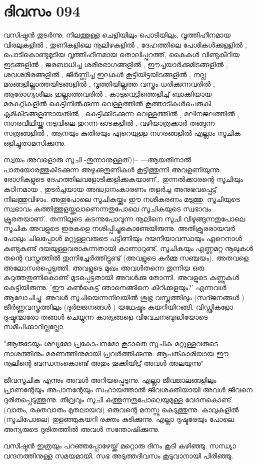 \newpage
\section{ദിവസം 094}


വസിഷ്ഠന്‍ തുടര്‍ന്നു: നിലത്തുള്ള ചെളിയിലും പൊടിയിലും, വൃത്തിഹീനമായ വിരലുകളില്‍ , തുണികളിലെ നൂലിഴകളില്‍ , ദേഹത്തിലെ പേശികള്‍ക്കുള്ളില്‍ , പൊടികൊണ്ടുമൂടിയ വൃത്തിഹീനമായ തൊലിപ്പുറത്ത്‌, കൈകള്‍ വിണ്ടുകീറിയ ഇടങ്ങളില്‍ , ജരബാധിച്ച ശരീരഭാഗങ്ങളില്‍ , ഈച്ചയാര്‍ക്കുമിടങ്ങളില്‍ , ശവശരീരങ്ങളില്‍ , ജീര്‍ണ്ണിച്ച ഇലകള്‍ കൂട്ടിയിട്ടയിടങ്ങളില്‍ , നല്ല മരങ്ങളില്ലാത്തയിടങ്ങളില്‍ , വൃത്തിയില്ലത്ത വസ്ത്രം ധരിക്കുന്നവരില്‍ , ആരോഗ്യശീലം ഇല്ലാത്തവരില്‍ , കാടുവെട്ടിത്തെളിച്ച്‌ ബാക്കിയായ മരകുറ്റികളില്‍ കെട്ടിനില്‍ക്കുന്ന വെള്ളത്തില്‍ കൂത്താടികള്‍പെരുകി കൃമികീടങ്ങളുണ്ടായതില്‍ , കെട്ടിക്കിടക്കുന്ന വെള്ളത്തില്‍ , മലിനജലത്തില്‍ , നഗരവീഥിയ്ക്കു നടുവിലെ തുറന്ന ഓടകളില്‍ , വഴിയാത്രക്കാര്‍ തങ്ങുന്ന സത്രങ്ങളില്‍ , ആനയും കുതിരയും ഏറെയുള്ള നഗരങ്ങളില്‍ എല്ലാം സൂചിക ഒളിച്ചുതാമസിക്കുന്നു. 


സ്വയം അവളൊരു സൂചി -തുന്നാനുള്ളത്‌))-- ---ആയതിനാല്‍ പാതയോരത്തുകിടക്കുന്ന അഴുക്കുതുണികള്‍ കൂട്ടിത്തുന്നി അവളണിയുന്നു. രോഗികളുടെ ദേഹത്തിലവളോടിക്കളിക്കുകയാണ്‌..  തുന്നല്‍ക്കാരന്റെ സൂചിയും കഠിനമായ , തുടര്‍ച്ചയായ അദ്ധ്വാനംകാരണം തളര്‍ച്ച അനുഭവപ്പെട്ട്‌ നിലത്തുവിഴാം.  അതുപോലെ സൂചികയ്ക്കും ഈ നശീകരണം മടുത്തു. സൂചിയുടെ സ്വഭാവം കുത്തിത്തുളയ്ക്കലാണെന്നതുപോലെ സൂചികയുടെ സ്വഭാവം ക്രൂരതയാണ്‌..  തന്നിലൂടെ കടന്നുപോവുന്ന നൂലിനെ സൂചി വിഴുങ്ങുന്നതുപോലെ സൂചിക അവളുടെ ഇരകളെ നശിപ്പിച്ചുകൊണ്ടേയിരുന്നു. അതിക്രൂരരായവര്‍ പോലും ചിലപ്പോള്‍ മറ്റുള്ളവരുടെ പട്ടിണിയും ദയനീയാവസ്ഥയും ഏറെനാള്‍ കണ്ടുകണ്ട്‌ ദയയുള്ളവരാകുന്നതായി കാണാറുണ്ട്‌. സൂചികയും എണ്ണമറ്റ നൂലുകള്‍ തന്റെ വസ്ത്രത്തില്‍ തുന്നിച്ചേര്‍ത്തിട്ടുണ്ട്‌ (അവളുടെ കര്‍മ്മ സഞ്ചയം). അതവളെ അലോസരപ്പെടുത്തി. അവളുടെ മുഖം അവള്‍തന്നെ തുന്നിയ ഒരു കറുത്തതുണികൊണ്ട്‌ മൂടപ്പെട്ടതായി അവള്‍ക്കു തോന്നി. അവളുടെ കണ്ണൂകള്‍ കെട്ടിയിരുന്നു. 'ഈ കണ്‍കെട്ട്‌ ഞാനെങ്ങിനെ കീറിക്കളയും?' എന്നവള്‍ ആലോചിച്ചു. അവള്‍ സൂചിയെന്നനിലയില്‍  ശുഭ്ര വസ്ത്രത്തിലും (സദ്ജനങ്ങള്‍ ) ജീര്‍ണ്ണവസ്ത്രത്തിലും (ദുര്‍ജ്ജനങ്ങള്‍ ) യഥേഷ്ടം കയറിയിറങ്ങി. വിഡ്ഢികളോ ദുഷ്ടന്മാരോ തങ്ങള്‍ ചെയ്യുന്ന കാര്യങ്ങളെ വിവേചനബുദ്ധിയോടെ സമീപിക്കാറില്ലല്ലോ. 

"ആരുടേയും ശല്യമോ പ്രകോപനമോ കൂടാതെ സൂചിക മറ്റുള്ളവരുടെ നാശത്തിനും മരണത്തിനുമായി പ്രവര്‍ത്തിക്കുന്നു. ആപത്കാരിയായ ഈ നൂലിന്റെ ബന്ധനംകൊണ്ട്‌ അതും തൂക്കിയിട്ട്‌ അവള്‍ അലയുന്നു"

ജീവസൂചിക എന്നും അവള്‍ അറിയപ്പെടുന്നു. എല്ലാ ജീവജാലങ്ങളിലും പ്രാണന്റേയും അപാനന്റേയും സഹായത്താല്‍ ജീവശക്തിയായി അവള്‍ ജീവനെ ദുരിതപ്പെടുത്തുന്നു. തീവ്രവും സൂചി കുത്തുന്നതുപോലെയുമുള്ള വേദനകൊണ്ട്‌ (വാതം, രക്തവാതം മുതലായവ) ഒരുവന്റെ മനസ്സു കെടുത്തുന്നു. കാലുകളില്‍ (സൂചിപോലെ) തുളഞ്ഞുകയറി രക്തം കുടിക്കുന്നു. എല്ലാ ദുഷ്ടരേയും പോലെ അന്യരുടെ ദുരിതത്തില്‍ അവള്‍ സന്തോഷിക്കുന്നു. 

വസിഷ്ഠന്‍ ഇത്രയും പറഞ്ഞപ്പോഴേയ്ക്ക്‌ മറ്റൊരു ദിനം കൂടി കഴിഞ്ഞു. സന്ധ്യാ വന്ദനത്തിനുള്ള സമയമായി. സഭ അടുത്തദിവസം കൂടുവാനായി പിരിഞ്ഞു. 

